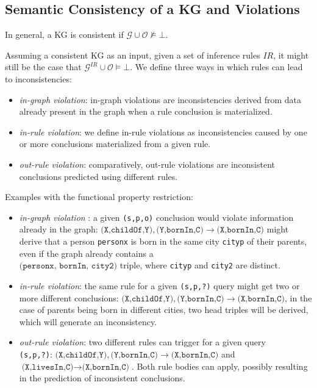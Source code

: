 \documentclass[a4paper,UKenglish,cleveref, autoref, thm-restate]{tgdk-v2021}
\begin{document}
\subsection{Semantic Consistency of a KG and Violations}

In general, a KG is consistent if $\mathcal{G} \cup \mathcal{O} \not\models \bot$. 

Assuming a consistent KG as an input, given a set of inference rules $IR$, it might still be the case that $\mathcal{G}^{IR} \cup \mathcal{O} \models \bot$. We define three ways in which rules can lead to inconsistencies:

\begin{itemize}
    \item \textit{in-graph violation}: in-graph violations are inconsistencies derived from data already present in the graph when a rule conclusion is materialized.
    \item \textit{in-rule violation}: we define in-rule violations as inconsistencies caused by one or more conclusions materialized from a given rule. 
    \item \textit{out-rule violation}: comparatively, out-rule violations are inconsistent conclusions predicted using different rules.
\end{itemize}

Examples with the functional property restriction:
\begin{itemize}
    \item \textit{in-graph violation} : a given \texttt{(s,p,o)} conclusion would violate information already in the graph:  $\texttt{(X,childOf,Y)}, \texttt{(Y,bornIn,C)} \rightarrow \texttt{(X,bornIn,C)} $ might derive that a person \texttt{personx} is born in the same city \texttt{cityp} of their parents, even if the graph already contains a \\ $\texttt{(personx, bornIn, city2)}$ triple, where \texttt{cityp} and \texttt{city2} are distinct.
    \item \textit{in-rule violation}: the same rule for a given \texttt{(s,p,?)} query might get two or more different conclusions: $\texttt{(X,childOf,Y)}, \texttt{(Y,bornIn,C)} \rightarrow \texttt{(X,bornIn,C)} $, in the case of parents being born in different cities, two head triples will be derived, which will generate an inconsistency.
    \item \textit{out-rule violation}: two different rules can trigger for a given query\\ \texttt{(s,p,?)}: 
    $\texttt{(X,childOf,Y)}, \texttt{(Y,bornIn,C)} \rightarrow \texttt{(X,bornIn,C)} $ and\\ $\texttt{(X,livesIn,C)} \rightarrow \texttt{(X,bornIn,C)}$. Both rule bodies can apply, possibly resulting in the prediction of inconsistent conclusions.
\end{itemize} 
\end{document}
